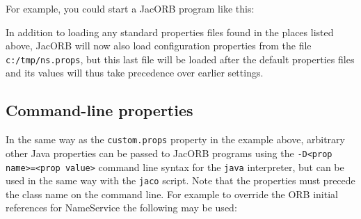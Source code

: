 For example, you could start a JacORB program like this:


In addition to loading any standard properties files found in the
places listed above, JacORB will now also load configuration
properties from the file {\tt c:/tmp/ns.props}, but this last file
will be loaded after the default properties files and its values will
thus take precedence over earlier settings.

\subsection{Command-line properties}

In the same way as the {\tt custom.props} property in the example
above, arbitrary other Java properties can be passed to JacORB
programs using the {\tt -D<prop name>=<prop value>} command line
syntax for the {\tt java} interpreter, but can be used in the same way
with the {\tt jaco} script. Note that the properties must precede
the class name on the command line. For example to override the
ORB initial references for NameService the following may be used:

